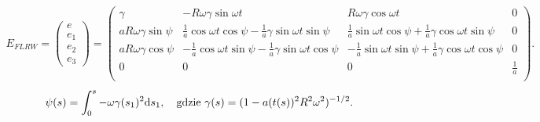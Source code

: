 \begin{align}\label{EFLRW}
E_{FLRW} = 
\begin{pmatrix}
e\\
e_1\\
e_2\\
e_3
\end{pmatrix}
=
\begin{pmatrix}
\gamma 	& -R\omega\gamma\sin\omega t 	
& R\omega\gamma\cos\omega t & 0 \\
a R\omega\gamma \sin \psi	
& \frac{1}{a} \cos\omega t \cos\psi - \frac{1}{a}\gamma \sin\omega t \sin\psi
& \frac{1}{a} \sin\omega t \cos\psi + \frac{1}{a}\gamma \cos\omega t \sin\psi
& 0 \\
a R\omega\gamma \cos \psi & -\frac{1}{a} \cos\omega t \sin\psi - 
\frac{1}{a}\gamma \sin\omega t \cos\psi
& -\frac{1}{a} \sin\omega t \sin\psi + 
\frac{1}{a}\gamma \cos\omega t \cos\psi		 & 0 \\
0&	0	& 0	& \frac{1}{a} \\
\end{pmatrix}.
\end{align}
\begin{align}\label{PsiFLRW}
\psi(s) =\int_0^s -\omega \gamma(s_1)^2  \text{d} s_1 , \quad 
\text{gdzie } \gamma(s) = (1-a(t(s))^2R^2\omega^2)^{-1/2}.
\end{align}

